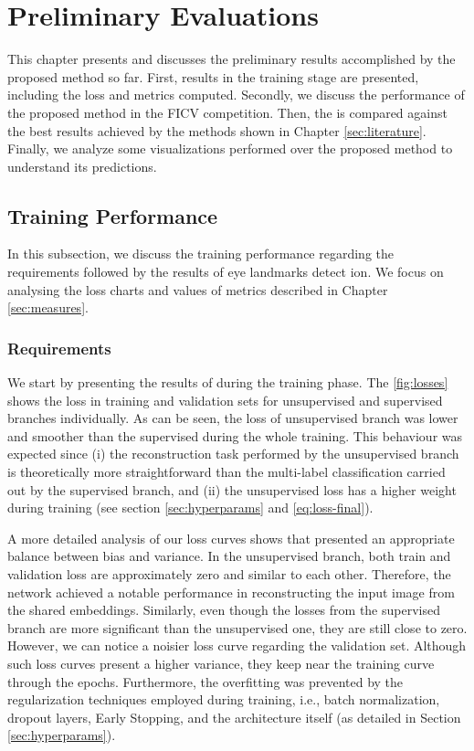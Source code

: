 \section{Preliminary Evaluations} \label{sec:results}

This chapter presents and discusses the preliminary results accomplished by the proposed method so far. First, \methodname results in the training stage are presented, including the loss and metrics computed. Secondly, we discuss the performance of the proposed method in the FICV competition. Then, the \methodname is compared against the best results achieved by the methods shown in Chapter \ref{sec:literature}. Finally, we analyze some visualizations performed over the proposed method to understand its predictions.

\subsection{Training Performance}

In this subsection, we discuss the training performance regarding the \icao requirements followed by the results of eye landmarks detect
ion. We focus on analysing  the loss charts and values of metrics described in Chapter \ref{sec:measures}.

\subsubsection{Requirements}

We start by presenting the results of \methodname during the training phase. The \autoref{fig:losses} shows the loss in training and validation sets for unsupervised and supervised branches individually. As can be seen, the loss of unsupervised branch was lower and smoother than the supervised during the whole training. This behaviour was expected since (i) the reconstruction task performed by the unsupervised branch is theoretically more straightforward than the multi-label classification carried out by the supervised branch, and (ii) the unsupervised loss has a higher weight during training (see section \ref{sec:hyperparams} and \autoref{eq:loss-final}). 

A more detailed analysis of our loss curves shows that \methodname presented an appropriate balance between bias and variance. In the unsupervised branch, both train and validation loss are approximately zero and similar to each other. Therefore, the network achieved a notable performance in reconstructing the input image from the shared embeddings. Similarly, even though the losses from the supervised branch are more significant than the unsupervised one, they are still close to zero. However, we can notice a noisier loss curve regarding the validation set. Although such loss curves present a higher variance, they keep near the training curve through the epochs. Furthermore, the overfitting was prevented by the regularization techniques employed during training, i.e., batch normalization, dropout layers, Early Stopping, and the architecture itself (as detailed in Section \ref{sec:hyperparams}).

